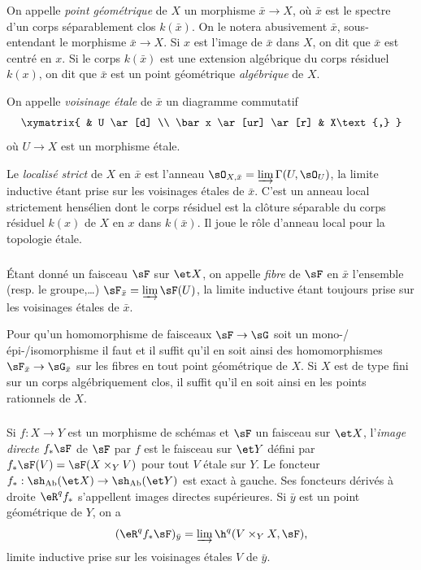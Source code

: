 On appelle \emph{point géométrique} de $X$ un morphisme $\bar x\to X$, où 
$\bar x$ est le spectre d'un corps séparablement clos $k(\bar x)$. On le notera 
abusivement $\bar x$, sous-entendant le morphisme $\bar x\to X$. Si $x$ est 
l'image de $\bar x$ dans $X$, on dit que $\bar x$ est centré en $x$. Si le 
corps $k(\bar x)$ est une extension algébrique du corps résiduel $k(x)$, on dit 
que $\bar x$ est un point géométrique \emph{algébrique} de $X$. 

On appelle \emph{voisinage étale} de $\bar x$ un diagramme commutatif 
\[\xymatrix{
  & U \ar[d] \\
  \bar x \ar[ur] \ar[r] 
  & X\text{,}
}\]
où $U\to X$ est un morphisme étale. 

Le \emph{localisé strict} de $X$ en $\bar x$ est l'anneau 
$\sO_{X,\bar x} = \varinjlim \Gamma(U,\sO_U)$, la limite inductive étant prise sur les 
voisinages étales de $\bar x$. C'est un anneau local strictement hensélien dont 
le corps résiduel est la clôture séparable du corps résiduel $k(x)$ de $X$ en 
$x$ dans $k(\bar x)$. Il joue le rôle d'anneau local pour la topologie étale. 





\subsubsection{}\label{I:2-3-2}

Étant donné un faisceau $\sF$ sur $\et X$, on appelle \emph{fibre} de $\sF$ en 
$\bar x$ l'ensemble (resp. le groupe,\dots) $\sF_{\bar x}=\varinjlim \sF(U)$, 
la limite inductive étant toujours prise sur les voisinages étales de $\bar x$. 

Pour qu'un homomorphisme de faisceaux $\sF\to \sG$ soit un 
mono-/épi-/isomorphisme il faut et il suffit qu'il en soit ainsi des homomorphismes 
$\sF_{\bar x}\to \sG_{\bar x}$  sur les fibres en tout point géométrique 
de $X$. Si $X$ est de type fini sur un corps algébriquement clos, il suffit 
qu'il en soit ainsi en les points rationnels de $X$. 





\subsubsection{}\label{I:2-3-3}

Si $f:X\to Y$ est un morphisme de schémas et $\sF$ un faisceau sur $\et X$, 
l'\emph{image directe} $f_* \sF$ de $\sF$ par $f$ est le faisceau sur $\et Y$ 
défini par $f_* \sF(V) = \sF(X\times_Y V)$ pour tout $V$ étale sur $Y$. Le foncteur 
$f_*:\sh_{\mathrm{Ab}}(\et X)\to \sh_{\mathrm{Ab}}(\et Y)$ est exact à gauche. Ses foncteurs 
dérivés à droite $\eR^q f_*$ s'appellent images directes supérieures. Si 
$\bar y$ est un point géométrique de $Y$, on a 
\[
  (\eR^q f_* \sF)_{\bar y} = \varinjlim \h^q(V\times_Y X,\sF)\text{,}
\]
limite inductive prise sur les voisinages étales $V$ de $\bar y$. 

